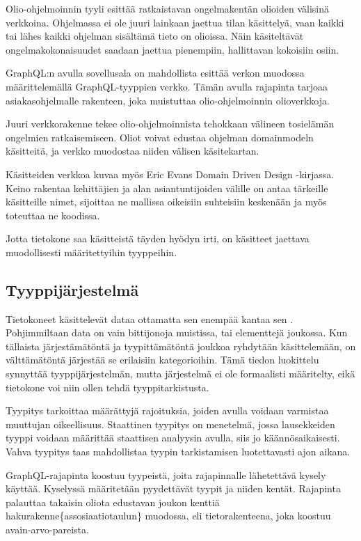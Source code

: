 Olio-ohjelmoinnin tyyli esittää ratkaistavan ongelmakentän olioiden
välisinä verkkoina. Ohjelmassa ei ole juuri lainkaan jaettua tilan
käsittelyä, vaan kaikki tai lähes kaikki ohjelman sisältämä tieto on
olioissa. Näin käsiteltävät ongelmakokonaisuudet saadaan jaettua
pienempiin, hallittavan kokoisiin osiin. \cite{booch2008object}

GraphQL:n avulla sovellusala on mahdollista esittää verkon muodossa
määrittelemällä GraphQL-tyyppien verkko. Tämän avulla rajapinta tarjoaa
asiakasohjelmalle rakenteen, joka muistuttaa olio-ohjelmoinnin
olioverkkoja.\cite{thinkingInGraphs}

Juuri verkkorakenne tekee olio-ohjelmoinnista tehokkaan välineen
tosielämän ongelmien ratkaisemiseen. Oliot voivat edustaa ohjelman
\gls{domainmodel}n käsitteitä, ja verkko muodostaa niiden välisen
käsitekartan.

Käsitteiden verkkoa kuvaa myös Eric Evans Domain Driven Design
-kirjassa. Keino rakentaa  kehittäjien ja alan
asiantuntijoiden välille on antaa tärkeille käsitteille nimet, sijoittaa
ne mallissa oikeisiin suhteisiin keskenään ja myös toteuttaa ne
koodissa.

Jotta tietokone saa käsitteistä täyden hyödyn irti, on käsitteet
jaettava muodollisesti määritettyihin tyyppeihin.

\hypertarget{tyyppijuxe4rjestelmuxe4}{%
\subsection{Tyyppijärjestelmä}\label{tyyppijuxe4rjestelmuxe4}}

Tietokoneet käsittelevät dataa ottamatta sen enempää kantaa sen
. Pohjimmiltaan data on vain bittijonoja
muistissa, tai elementtejä joukossa. Kun tällaista järjestämätöntä ja
tyypittämätöntä joukkoa ryhdytään käsittelemään, on välttämätöntä
järjestää se erilaisiin kategorioihin. Tämä tiedon luokittelu synnyttää
tyyppijärjestelmän, mutta järjestelmä ei ole formaalisti määritelty,
eikä tietokone voi niin ollen tehdä tyyppitarkistusta.

Tyypitys tarkoittaa määrättyjä rajoituksia, joiden avulla voidaan
varmistaa muuttujan oikeellisuus. Staattinen tyypitys on menetelmä,
jossa lausekkeiden tyyppi voidaan määrittää staattisen analyysin avulla,
siis jo käännösaikaisesti. Vahva tyypitys taas mahdollistaa tyypin
tarkistamisen luotettavasti ajon aikana. \cite{Cardelli+Wegner:1985}

GraphQL-rajapinta koostuu tyypeistä, joita rajapinnalle lähetettävä
kysely käyttää. Kyselyssä määritetään pyydettävät tyypit ja niiden
kentät. Rajapinta palauttaa takaisin oliota edustavan joukon kenttiä
\gls{hakurakenne}\{assosiaatiotaulun\} muodossa, eli tietorakenteena,
joka koostuu avain-arvo-pareista. \cite{graphql:spec}

